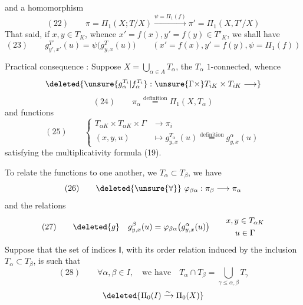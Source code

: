 and a homomorphism
\[
(22)\qquad\pi=\Pi_1(X;T/X)\overset{\psi=\Pi_1(f)}{\longrightarrow}\pi'=\Pi_1(X,T'/X)
\]
That said, if $x,y\in T_K$, whence $x'=f(x),y'=f(y)\in T'_K$, we shall have
\[
(23)\qquad g_{y',x'}^{T'}(u)=\psi\bigl(g_{y,x}^T(u)\bigr)
\qquad(x'=f(x),y'=f(y),\psi=\Pi_1(f))
\]

Practical consequence : Suppose $X=\bigcup_{\alpha\in A}T_\alpha$, the $T_\alpha$ $1$-connected, whence  
\[
\deleted{\unsure{g_\alpha^{T_i}|f_\alpha^{T_i}}:\unsure{\Gamma\times}T_{iK}\times T_{iK}\longrightarrow}
\]
\[
(24)\qquad \pi_\alpha\overset{\text{definition}}{=}\Pi_1(X,T_\alpha)
\]
and functions
\[
(25)\qquad\left\{\begin{aligned}
T_{\alpha K}\times T_{\alpha K}\times\Gamma&\longrightarrow\pi_i\\
(x,y,u)&\longmapsto g_{y,x}^{T_\alpha}(u)\overset{\text{definition}}{=}g_{y,x}^{\alpha}(u)
\end{aligned}\right.
\]
satisfying the multiplicativity formula (19).

To relate the functions to one another,  we   $T_\alpha\subset T_\beta$, we have
\[
(26)\qquad\deleted{\unsure{\forall}}\ \varphi_{\beta\alpha}:\pi_\beta\longrightarrow\pi_\alpha
\]
and the relations
\[
(27)\qquad\deleted{g}\quad g_{y,x}^{\beta}(u)=\varphi_{\beta\alpha}\bigl(g_{y,x}^{\alpha}(u)\bigr)\qquad\begin{gathered}x,y\in T_{\alpha K}\\u\in\Gamma\end{gathered}
\]
Suppose that the set of indices $\mathbb{I}$, with its order relation induced by the inclusion $T_\alpha\subset T_\beta$, is such that 
\[
(28)\qquad\forall\alpha,\beta\in I,\quad\text{we have}\quad T_\alpha\cap T_\beta=\bigcup_{\gamma\le\alpha,\beta}T_\gamma
\]
\[
\deleted{\Pi_0(I)\xrightarrow{\sim}\Pi_0(X)}
\]
